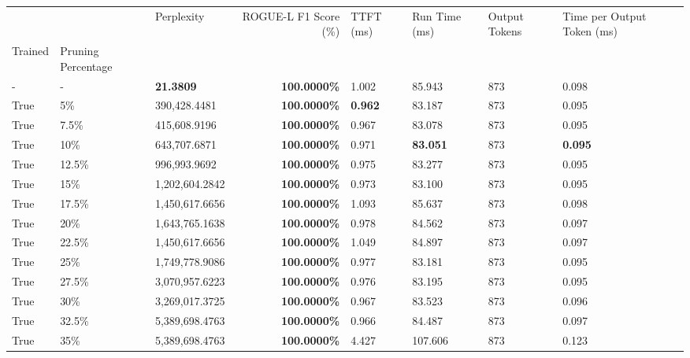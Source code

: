 \begin{table}[H]
{\label{tab:evaluation-pipeline-6}
\begin{tabular}{lllrllll}
\toprule
 &  & Perplexity & ROGUE-L F1 Score (\%) & TTFT (ms) & Run Time (ms) & Output Tokens & Time per Output Token (ms) \\
Trained & Pruning Percentage &  &  &  &  &  &  \\
\midrule
- & - & \bfseries 21.3809 & \bfseries 100.0000\% & 1.002 & 85.943 & 873 & 0.098 \\
\cline{1-8} \cline{2-8}
True & 5\% & 390,428.4481 & \bfseries \color{red} 100.0000\% & \bfseries \color{red} 0.962 & 83.187 & 873 & 0.095 \\
\cline{1-8} \cline{2-8}
True & 7.5\% & 415,608.9196 & \bfseries \color{red} 100.0000\% & 0.967 & 83.078 & 873 & 0.095 \\
\cline{1-8} \cline{2-8}
True & 10\% & 643,707.6871 & \bfseries \color{red} 100.0000\% & 0.971 & \bfseries \color{red} 83.051 & 873 & \bfseries \color{red} 0.095 \\
\cline{1-8} \cline{2-8}
True & 12.5\% & 996,993.9692 & \bfseries \color{red} 100.0000\% & 0.975 & 83.277 & 873 & 0.095 \\
\cline{1-8} \cline{2-8}
True & 15\% & 1,202,604.2842 & \bfseries \color{red} 100.0000\% & 0.973 & 83.100 & 873 & 0.095 \\
\cline{1-8} \cline{2-8}
True & 17.5\% & 1,450,617.6656 & \bfseries \color{red} 100.0000\% & 1.093 & 85.637 & 873 & 0.098 \\
\cline{1-8} \cline{2-8}
True & 20\% & 1,643,765.1638 & \bfseries \color{red} 100.0000\% & 0.978 & 84.562 & 873 & 0.097 \\
\cline{1-8} \cline{2-8}
True & 22.5\% & 1,450,617.6656 & \bfseries \color{red} 100.0000\% & 1.049 & 84.897 & 873 & 0.097 \\
\cline{1-8} \cline{2-8}
True & 25\% & 1,749,778.9086 & \bfseries \color{red} 100.0000\% & 0.977 & 83.181 & 873 & 0.095 \\
\cline{1-8} \cline{2-8}
True & 27.5\% & 3,070,957.6223 & \bfseries \color{red} 100.0000\% & 0.976 & 83.195 & 873 & 0.095 \\
\cline{1-8} \cline{2-8}
True & 30\% & 3,269,017.3725 & \bfseries \color{red} 100.0000\% & 0.967 & 83.523 & 873 & 0.096 \\
\cline{1-8} \cline{2-8}
True & 32.5\% & 5,389,698.4763 & \bfseries \color{red} 100.0000\% & 0.966 & 84.487 & 873 & 0.097 \\
\cline{1-8} \cline{2-8}
True & 35\% & 5,389,698.4763 & \bfseries \color{red} 100.0000\% & 4.427 & 107.606 & 873 & 0.123 \\

\end{tabular}}
\end{table}
